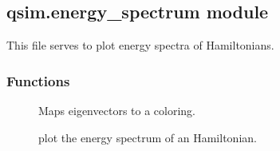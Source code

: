 \documentclass[letterpaper,10pt,english]{sphinxmanual}
\begin{document}
\subsection{qsim.energy\_spectrum module}
\label{\detokenize{qsim:module-qsim.energy_spectrum}}\label{\detokenize{qsim:qsim-energy-spectrum-module}}
This file serves to plot energy spectra of Hamiltonians.


\subsubsection{Functions}
\label{\detokenize{qsim:id13}}\begin{description}
\item[{{\hyperref[\detokenize{qsim:qsim.energy_spectrum.vector_color_map}]{}}}] \leavevmode
Maps eigenvectors to a coloring.

\item[{{\hyperref[\detokenize{qsim:qsim.energy_spectrum.plot_energy_spectrum}]{}}}] \leavevmode
plot the energy spectrum of an Hamiltonian.

\end{description}
\end{document}
